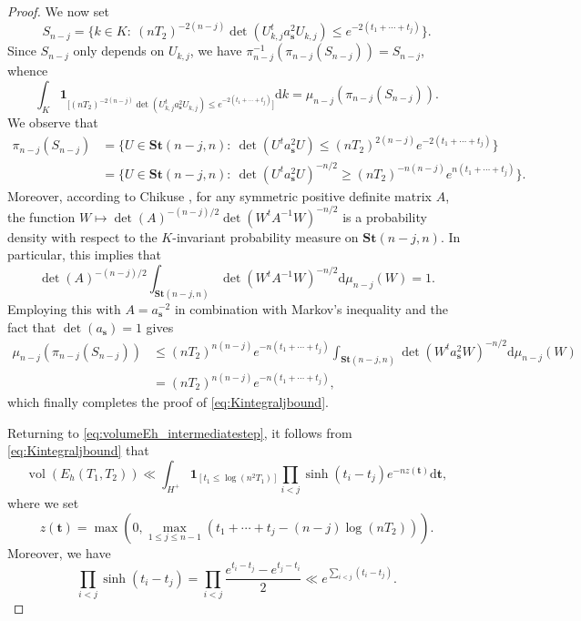 \documentclass[11pt,reqno]{amsart}
\theoremstyle{definition}
\theoremstyle{remark}
\newcommand{\vol}{\operatorname{vol}}
\numberwithin{equation}{section}
\numberwithin{thm}{section}
\numberwithin{table}{section}
\begin{document}
\begin{proof}
We now set
\[
    S_{n-j} = \{ k \in K:~(nT_2)^{-2(n-j)} \det(U_{k,j}^ta_{\mathbf{s}}^2 U_{k,j}) \le e^{-2(t_1 + \cdots + t_j)} \}.
\]
Since $S_{n-j}$ only depends on $U_{k,j}$, we have
$ \pi_{n-j}^{-1}(\pi_{n-j}(S_{n-j})) = S_{n-j}$, whence
\[
   \int_K  \mathbf{1}_{\big[ (nT_2)^{-2(n-j)} \det(U_{k,j}^ta_{\mathbf{s}}^2 U_{k,j}) \le e^{-2(t_1 + \cdots + t_j)}\big]} \mathrm{d}k  =  \mu_{n-j} (\pi_{n-j}(S_{n-j})).
\]
We observe that 
\begin{align*}
        \pi_{n-j}(S_{n-j}) 
        &= \{ U \in \mathbf{St}(n-j,n):~\det(U^ta_\mathbf{s}^2U) \le (nT_2)^{2(n-j)} e^{-2(t_1 +\cdots+t_j)} \} \\
        &= \{ U \in \mathbf{St}(n-j,n):~\det(U^ta_\mathbf{s}^2U)^{-n/2} \ge (nT_2)^{-n(n-j)} e^{n(t_1 +\cdots+t_j)} \}.
\end{align*}
Moreover, according to Chikuse \cite[Theorem~2.2]{chikuse_macg1990}, for any symmetric positive definite matrix $A$, the function $W \mapsto \det(A)^{-(n-j)/2} \det(W^t A^{-1} W)^{-n/2}$ is a probability  density with respect to the $K$-invariant probability measure on $\mathbf{St}(n-j,n)$. In particular, this implies that
\[
    \det(A)^{-(n-j)/2}
    \int_{\mathbf{St}(n-j,n)}  \det(W^t A^{-1} W)^{-n/2}\mathrm{d}\mu_{n-j}(W) =1.
\]
Employing this with $A = a_{\mathbf{s}}^{-2}$ in combination with Markov's inequality and the fact that $\det(a_\mathbf{s})=1$ gives
\begin{align*}
        \mu_{n-j}(\pi_{n-j}(S_{n-j})) &\le (nT_2)^{n(n-j)} e^{-n(t_1 +\cdots+t_j)} \int_{\mathbf{St}(n-j,n)} \det(W^ta_\mathbf{s}^2 W)^{-n/2} \mathrm{d}\mu_{n-j}(W) \\
        &= (nT_2)^{n(n-j)} e^{-n(t_1 +\cdots+t_j)}, 
\end{align*}
which finally completes the proof of  \eqref{eq:Kintegraljbound}.

Returning to \eqref{eq:volumeEh_intermediatestep}, it follows from  \eqref{eq:Kintegraljbound} that 
\[
    \vol(E_h(T_1,T_2)) \ll \int_{H^+}  \mathbf{1}_{[t_1 \le \log(n^2T_1)]} \prod_{i<j} \sinh(t_i - t_j) e^{-n z(\mathbf{t})}\mathrm{d}\mathbf{t},
\]
where we set 
\[
    z(\mathbf{t}) = \max \left(0, \max_{1 \le j \le n-1} (t_1 + \cdots+ t_j - (n-j)\log(n T_2)) 
    \right).
\]
Moreover, we have 
\[
     \prod_{i<j} \sinh(t_i - t_j)
     = 
     \prod_{i<j} \frac{e^{t_i - t_j}-e^{t_j-t_i}}{2}
     \ll e^{\sum_{i<j}(t_i-t_j)}.
\]


\end{proof}
\end{document}
